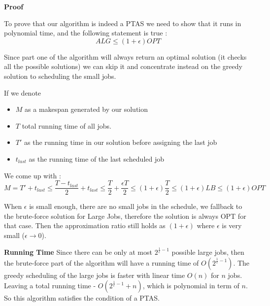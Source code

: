 \textbf{Proof}

To prove that our algorithm is indeed a PTAS we need to show that it runs in polynomial time, and the following statement is true :
$$ ALG \le (1 + \epsilon ) OPT $$ 

Since part one of the algorithm will always return an optimal solution (it checks all 
the possible solutions) we can skip it and concentrate instead on the greedy solution
to scheduling the small jobs.

If we denote 
\begin{itemize}
	\item $ M $ as a makespan generated by our solution
	\item $ T $ total running time of all jobs.
	\item $ T' $ as the running time in our solution before assigning the last job
	\item $ t_{last} $ as the running time of the last scheduled job
\end{itemize}
We come up with :
$$ M = T' + t_{last} \le \frac{T - t_{last}}{2} + t_{last} \le \frac{T}{2} + \frac{\epsilon T}{2} \le (1 + \epsilon)\frac{T}{2} \le (1 + \epsilon )LB \le (1 + \epsilon)OPT$$

When $\epsilon$ is small enough, there are no small jobs in the schedule, we fallback to the brute-force solution for Large Jobs, therefore the solution is always OPT for that case. Then the approximation ratio still holds as $(1 + \epsilon)$ where $\epsilon$ is very small ($\epsilon \to 0$).

\textbf{Running Time}
Since there can be only at most $ 2^{\frac{1}{\epsilon}-1} $ possible large jobs, then the brute-force part of the algorithm will have a running time of $ O(2^{\frac{1}{\epsilon}-1}) $. The greedy scheduling of the large jobs is faster with linear time $ O(n) $ for $ n $ jobs. Leaving a total running time - $ O(2^{\frac{1}{\epsilon}-1} + n) $, which is polynomial in term of $n$. So this algorithm satisfies the condition of a PTAS.

